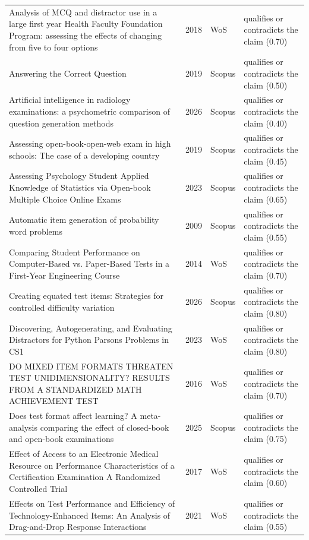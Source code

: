 \begin{longtable}{@{}%
  >{\raggedright\arraybackslash}p{}c%
  >{\raggedright\arraybackslash}p{}%
  >{\raggedright\arraybackslash}p{}@{}}
Analysis of MCQ and distractor use in a large first year Health Faculty Foundation Program: assessing the effects of changing from five to four options & 2018 & WoS & qualifies or contradicts the claim (0.70) \\
Answering the Correct Question & 2019 & Scopus & qualifies or contradicts the claim (0.50) \\
Artificial intelligence in radiology examinations: a psychometric comparison of question generation methods & 2026 & Scopus & qualifies or contradicts the claim (0.40) \\
Assessing open-book-open-web exam in high schools: The case of a developing country & 2019 & Scopus & qualifies or contradicts the claim (0.45) \\
Assessing Psychology Student Applied Knowledge of Statistics via Open-book Multiple Choice Online Exams & 2023 & Scopus & qualifies or contradicts the claim (0.65) \\
Automatic item generation of probability word problems & 2009 & Scopus & qualifies or contradicts the claim (0.55) \\
Comparing Student Performance on Computer-Based vs. Paper-Based Tests in a First-Year Engineering Course & 2014 & WoS & qualifies or contradicts the claim (0.70) \\
Creating equated test items: Strategies for controlled difficulty variation & 2026 & Scopus & qualifies or contradicts the claim (0.80) \\
Discovering, Autogenerating, and Evaluating Distractors for Python Parsons Problems in CS1 & 2023 & WoS & qualifies or contradicts the claim (0.80) \\
DO MIXED ITEM FORMATS THREATEN TEST UNIDIMENSIONALITY? RESULTS FROM A STANDARDIZED MATH ACHIEVEMENT TEST & 2016 & WoS & qualifies or contradicts the claim (0.70) \\
Does test format affect learning? A meta-analysis comparing the effect of closed-book and open-book examinations & 2025 & Scopus & qualifies or contradicts the claim (0.75) \\
Effect of Access to an Electronic Medical Resource on Performance Characteristics of a Certification Examination A Randomized Controlled Trial & 2017 & WoS & qualifies or contradicts the claim (0.60) \\
Effects on Test Performance and Efficiency of Technology-Enhanced Items: An Analysis of Drag-and-Drop Response Interactions & 2021 & WoS & qualifies or contradicts the claim (0.55) \\

\end{longtable}
